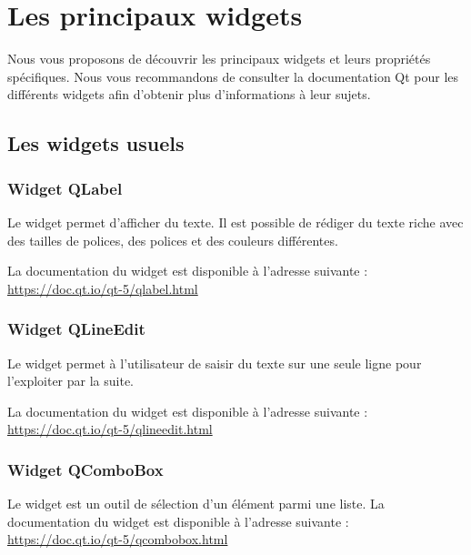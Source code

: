 {\chapter{Les principaux widgets}

Nous vous proposons de découvrir les principaux widgets et leurs propriétés spécifiques.
\newline
Nous vous recommandons de consulter la documentation Qt pour les différents widgets afin d'obtenir plus d'informations à leur sujets.

\section{Les widgets usuels}
\subsection{Widget QLabel}

Le widget  permet d'afficher du texte. 
Il est possible de rédiger du texte riche avec des tailles de polices, des polices et des couleurs différentes. \newline \newline


La documentation du widget est disponible à l'adresse suivante : \newline  \url{https://doc.qt.io/qt-5/qlabel.html}


\subsection{Widget QLineEdit}

Le widget  permet à l'utilisateur de saisir du texte sur une seule ligne pour l'exploiter par la suite. 


La documentation du widget est disponible à l'adresse suivante : \newline  \url{https://doc.qt.io/qt-5/qlineedit.html}


\subsection{Widget QComboBox}

Le widget  est un outil de sélection d'un élément parmi une liste. \newline \newline
La documentation du widget est disponible à l'adresse suivante : \\  \url{https://doc.qt.io/qt-5/qcombobox.html} 

}
